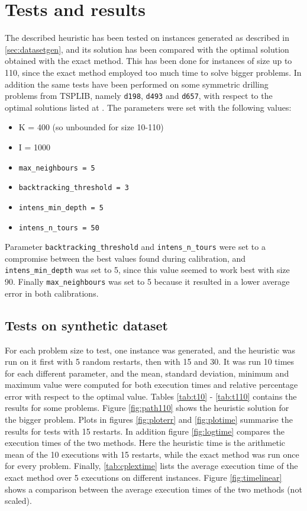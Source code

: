 
\section{Tests and results}
\label{sec:results}
The described heuristic has been tested on instances generated as described in \cref{sec:datasetgen}, and its solution has been compared with the optimal solution obtained with the exact method. This has been done for instances of size up to 110, since the exact method employed too much time to solve bigger problems. In addition the same tests have been performed on some symmetric drilling problems from TSPLIB, namely \texttt{d198}, \texttt{d493} and \texttt{d657}, with respect to the optimal solutions listed at \cite{Tsplibsol}.
The parameters were set with the following values:
\begin{itemize}
	\setlength\itemsep{0.03em}
	\item K = 400 (so unbounded for size 10-110)
	\item I = 1000
	\item \texttt{max\_neighbours = 5}
	\item \texttt{backtracking\_threshold = 3}
	\item \texttt{intens\_min\_depth = 5}
	\item \texttt{intens\_n\_tours = 50}
\end{itemize}
Parameter \texttt{backtracking\_threshold} and \texttt{intens\_n\_tours} were set to a compromise between the best values found during calibration, and \texttt{intens\_min\_depth} was set to 5, since this value seemed to work best with size 90. Finally \texttt{max\_neighbours} was set to 5 because it resulted in a lower average error in both calibrations.

\subsection{Tests on synthetic dataset}
For each problem size to test, one instance was generated, and the heuristic was run on it first with 5 random restarts, then with 15 and 30. It was run 10 times for each different parameter, and the mean, standard deviation, minimum and maximum value were computed for both execution times and relative percentage error with respect to the optimal value. Tables \ref{tab:t10} - \ref{tab:t110} contains the results for some problems. Figure \ref{fig:path110} shows the heuristic solution for the bigger problem. Plots in figures \ref{fig:ploterr} and \ref{fig:plotime} summarise the results for tests with 15 restarts. In addition figure \ref{fig:logtime} compares the execution times of the two methods. Here the heuristic time is the arithmetic mean of the 10 executions with 15 restarts, while the exact method was run once for every problem. Finally, \cref{tab:cplextime} lists the average execution time of the exact method over 5 executions on different instances. Figure \ref{fig:timelinear} shows a comparison between the average execution times of the two methods (not scaled). 

